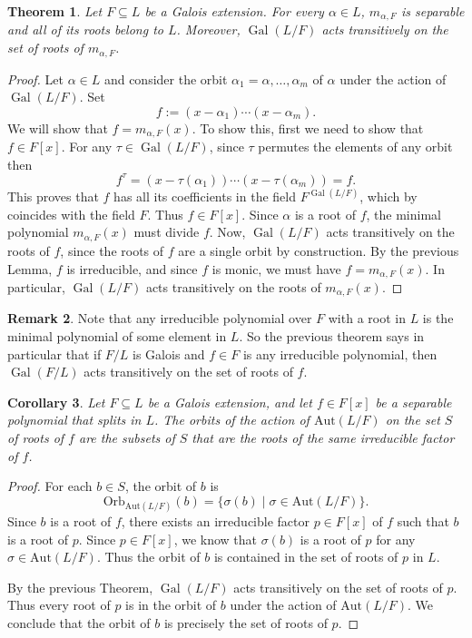 \documentclass[12pt]{report}
\newtheorem{theorem}{Theorem}[chapter]
\newtheorem{corollary}[theorem]{Corollary}
\numberwithin{equation}{section}
\numberwithin{theorem}{chapter}
\theoremstyle{definition}
\newtheorem*{basic properties}{Basic Properties}
\newtheorem*{Important Remark}{Important Remark}
\newtheorem{remark}[theorem]{Remark}
\DeclareMathOperator{\Gal}{Gal}
\begin{document}
\begin{theorem}\label{galois extension all min pols separable}
Let $F \subseteq L$ be a Galois extension.
For every $\alpha \in L$, $m_{\alpha, F}$ is separable and all of its roots belong to $L$. Moreover, $\Gal(L/F)$ acts transitively on the set of roots of $m_{\alpha,F}$.
\end{theorem}

\begin{proof}
Let $\alpha \in L$ and consider the orbit $\alpha_1 = \alpha, \ldots, \alpha_m$
of $\alpha$ under the action of $\Gal(L/F)$. Set
$$f := (x-\alpha_1) \cdots (x-\alpha_m).$$
We will show that $f=m_{\alpha,F}(x)$. To show this, first we need to show that $f\in F[x]$.
For any $\tau \in \Gal(L/F)$, since $\tau$ permutes the elements of any orbit then
$$f^\tau = (x-\tau(\alpha_1)) \cdots (x-\tau(\alpha_m)) = f.$$
This proves that $f$ has all its coefficients in the field $F^{\Gal(L/F)}$, which by  coincides with the field $F$.
Thus $f \in F[x]$. Since $\alpha$ is a root of $f$, the minimal polynomial $m_{\alpha,F}(x)$ must divide $f$.
Now, $\Gal(L/F)$ acts transitively on the roots of $f$, since the roots of $f$ are a single orbit by construction. By the previous Lemma, $f$ is irreducible, and since $f$ is monic, we must have $f=m_{\alpha,F}(x)$. In particular, $\Gal(L/F)$ acts transitively on the roots of $m_{\alpha,F}(x)$.
\end{proof}


\begin{remark}
	Note that any irreducible polynomial over $F$ with a root in $L$ is the minimal polynomial of some element in $L$.
So the previous theorem says in particular that if $F/L$ is Galois and $f \in F$ is any irreducible polynomial, then $\Gal(F/L)$ acts transitively on the set of roots of $f$.
\end{remark}


\begin{corollary}
	Let $F \subseteq L$ be a Galois extension, and let $f\in F[x]$ be a separable polynomial that splits in $L$. The orbits of the action of $\mathrm{Aut}(L/F)$ on the set $S$ of roots of $f$ are the subsets of $S$ that are the roots of the same irreducible factor of $f$.
\end{corollary}

\begin{proof}
For each $b \in S$, the orbit of $b$ is 
$$\mathrm{Orb}_{\mathrm{Aut}(L/F)}(b) = \{\sigma(b) \mid \sigma\in \mathrm{Aut}(L/F)\}.$$ 
Since $b$ is a root of $f$, there exists an irreducible factor $p \in F[x]$ of $f$ such that $b$ is a root of $p$. Since $p \in F[x]$, we know that $\sigma(b)$ is a root of $p$ for any $\sigma \in \mathrm{Aut}(L/F)$. Thus the orbit of $b$ is contained in the set of roots of $p$ in $L$.

By the previous Theorem, $\Gal(L/F)$ acts transitively on the set of roots of $p$. Thus every root of $p$ is in the orbit of $b$ under the action of $\mathrm{Aut}(L/F)$. We conclude that the orbit of $b$ is precisely the set of roots of $p$.
\end{proof}
\end{document}
